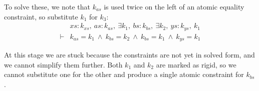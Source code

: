 To solve these, we note that $k_{as}$ is used twice on the left of an atomic equality constraint, so substitute $k_1$ for $k_3$:
$$
\begin{array}{ll}
       & xs : k_{xs},~ as : k_{as},~ \exists k_1,~ bs : k_{bs},~ \exists k_2,~ ys : k_{ys},~ k_1
\\
\vdash &          k_{as}   = k_1
        ~\wedge~  k_{bs}   = k_2
        ~\wedge~  k_{bs}   = k_1
        ~\wedge~  k_{ys}   = k_1
\end{array}
$$

At this stage we are stuck because the constraints are not yet in solved form, and we cannot simplify them further. Both $k_1$ and $k_2$ are marked as rigid, so we cannot substitute one for the other and produce a single atomic constraint for $k_{bs}$.


% 

% 




